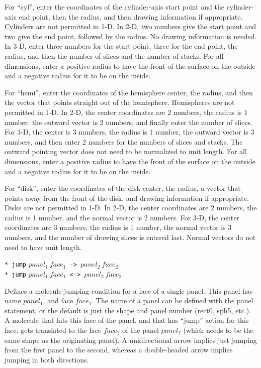 \documentclass {scrbook}
\newcommand {\ttt} {\texttt}
\begin{document}
\begin{description}
For ``cyl'', enter the coordinates of the cylinder-axis start point and the cylinder-axis end point, then the radius, and then drawing information if appropriate. Cylinders are not permitted in 1-D. In 2-D, two numbers give the start point and two give the end point, followed by the radius. No drawing information is needed. In 3-D, enter three numbers for the start point, three for the end point, the radius, and then the number of slices and the number of stacks. For all dimensions, enter a positive radius to have the front of the surface on the outside and a negative radius for it to be on the inside.

For ``hemi'', enter the coordinates of the hemisphere center, the radius, and then the vector that points straight out of the hemisphere. Hemispheres are not permitted in 1-D. In 2-D, the center coordinates are 2 numbers, the radius is 1 number, the outward vector is 2 numbers, and finally enter the number of slices. For 3-D, the center is 3 numbers, the radius is 1 number, the outward vector is 3 numbers, and then enter 2 numbers for the numbers of slices and stacks. The outward pointing vector does not need to be normalized to unit length. For all dimensions, enter a positive radius to have the front of the surface on the outside and a negative radius for it to be on the inside.

For ``disk'', enter the coordinates of the disk center, the radius, a vector that points away from the front of the disk, and drawing information if appropriate. Disks are not permitted in 1-D. In 2-D, the center coordinates are 2 numbers, the radius is 1 number, and the normal vector is 2 numbers. For 3-D, the center coordinates are 3 numbers, the radius is 1 number, the normal vector is 3 numbers, and the number of drawing slices is entered last. Normal vectors do not need to have unit length.

\item{\ttt{* jump} $panel_1\ face_1$\ttt{ -> }$panel_2\ face_2$\\
\ttt{* jump} $panel_1\ face_1$\ttt{ <-> }$panel_2\ face_2$}

Defines a molecule jumping condition for a face of a single panel. This panel has name $panel_1$, and face $face_1$. The name of a panel can be defined with the panel statement, or the default is just the shape and panel number (rect0, sph5, etc.). A molecule that hits this face of the panel, and that has ``jump'' action for this face, gets translated to the face $face_2$ of the panel $panel_2$ (which needs to be the same shape as the originating panel). A unidirectional arrow implies just jumping from the first panel to the second, whereas a double-headed arrow implies jumping in both directions.


\end{description}
\end{document}
